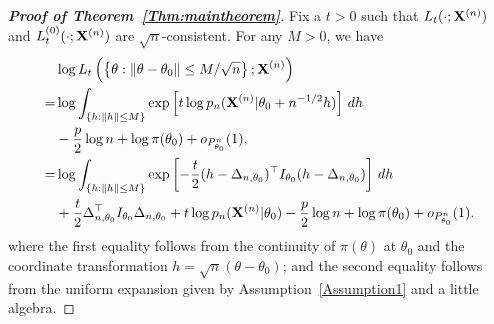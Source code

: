 \documentclass[11pt]{article}
\theoremstyle{plain}
\theoremstyle{definition}
\theoremstyle{remark}
\begin{document}
\begin{appendices}
    \begin{proof}[\textbf{Proof of Theorem~\ref{Thm:maintheorem}}]
        Fix a $t>0$ such that $L_t(\cdot;\mathbf{X}^{(n)})$ and $L_t^{(0)}(\cdot;\mathbf{X}^{(n)})$ are $\sqrt{n}$-consistent.
        For any $M>0$, we have
\begin{align*}
    &\log L_t\left(\left\{\theta:\|\theta-\theta_0\|\leq M/\sqrt{n}\right\};\mathbf{X}^{(n)}\right)
    \\
    =
    &\log \int_{\{h:\|h\|\leq M\}}\exp\left[ t\log p_n(\mathbf{X}^{(n)}|\theta_0+n^{-1/2}h)\right] \, dh
    \\
    &-\frac{p}{2}\log n+\log \pi(\theta_0)+o_{P^n_{\theta_0}}(1),
    \\
    =&\log \int_{\{h:\|h\|\leq M\}}\exp\left[ -\frac{t}{2}(h-\Delta_{n,\theta_0})^\top  I_{\theta_0}(h-\Delta_{n,\theta_0})\right] \, dh
    \\
    & +
    \frac{t}{2}\Delta_{n,\theta_0}^\top  I_{\theta_0}\Delta_{n,\theta_0}
    +
    t\log p_n(\mathbf{X}^{(n)}|\theta_0)
    -\frac{p}{2}\log n+\log \pi(\theta_0)+o_{P^n_{\theta_0}}(1).
\end{align*}
where the first equality follows from the continuity of $\pi(\theta)$ at $\theta_0$ and the coordinate transformation $h=\sqrt{n}(\theta-\theta_0)$;
and the second equality follows from the uniform expansion given by Assumption~\ref{Assumption1} and a little algebra.

\end{proof}
\end{appendices}
\end{document}
